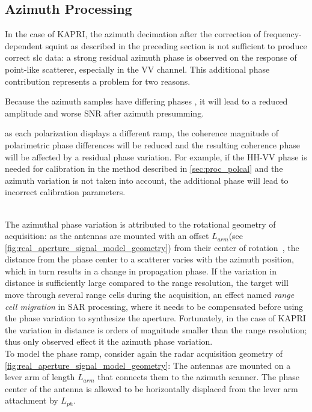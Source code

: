 \subsection{Azimuth Processing}\label{sec:azimuth_processing}
In the case of KAPRI, the azimuth decimation after the correction of frequency-dependent squint as described in the preceding section is not sufficient to produce correct slc data: a strong residual  azimuth phase is observed on the response of point-like scatterer, especially in the VV channel. This additional phase contribution represents a problem for two reasons.
\begin{enumerate*}
	\item Because the azimuth samples have differing phases
	, it will lead to a reduced amplitude and worse SNR after azimuth presumming. 
  \item as each polarization displays a different ramp, the coherence magnitude of polarimetric phase differences will be reduced and the resulting coherence phase will be affected by a residual phase variation. For example, if the HH-VV phase is needed for calibration in the method described in \autoref{sec:proc_polcal} and the azimuth variation is not taken into account, the additional phase will lead to incorrect calibration parameters.\label{item:phase_variation}\end{enumerate*}\\
The azimuthal phase variation is attributed to the rotational geometry of acquisition: as the antennas are mounted with an  offset $L_{arm}$(see \autoref{fig:real_aperture_signal_model_geometry}) from their center of rotation~\cite{Lee2014}, the distance from the phase center to a scatterer varies with the azimuth position, which in turn results in a change in propagation phase. If the variation in distance is sufficiently large compared to the range resolution, the target will move through several range cells during the acquisition, an effect named \emph{range cell migration} in SAR processing, where it needs to be compensated before using the phase variation to synthesize the aperture. Fortunately, in the case of KAPRI the variation in distance is orders of magnitude smaller than the range resolution; thus only observed effect it the azimuth phase variation.\\
To model the phase ramp, consider again the radar acquisition geometry of \autoref{fig:real_aperture_signal_model_geometry}:
The antennas are mounted on a lever arm of length $L_{arm}$ that connects them to the azimuth scanner.
The phase center of the antenna is allowed to be horizontally displaced from the lever arm attachment by $L_{ph}$.
